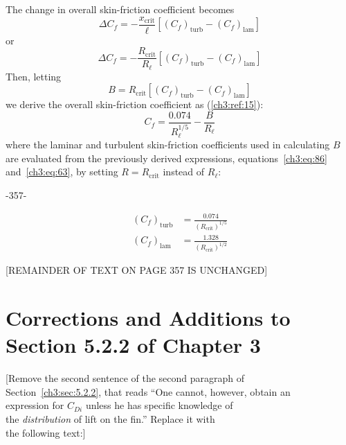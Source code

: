 The change in overall skin-friction coefficient becomes
\begin{equation*}\tag{98}
\Delta C_f = -\frac{x_{\mathrm{crit}}}{\ell}\left[(C_f)_{\mathrm{turb}} - (C_f)_{\mathrm{lam}}\right]
\end{equation*}
or
\begin{equation*}\tag{99}
\Delta C_f = -\frac{R_{\mathrm{crit}}}{R_\ell}\left[(C_f)_{\mathrm{turb}} - (C_f)_{\mathrm{lam}}\right]
\end{equation*}
Then, letting
\begin{equation*}\tag{100}
B = R_{\mathrm{crit}}\left[(C_f)_{\mathrm{turb}} - (C_f)_{\mathrm{lam}}\right]
\end{equation*}
we derive the overall skin-friction coefficient as (\ref{ch3:ref:15}):
\begin{equation*}\tag{101}
C_f = \frac{0.074}{R_\ell^{1/5}} - \frac{B}{R_\ell}
\end{equation*}
where the laminar and turbulent skin-friction coefficients used in calculating
$B$ are evaluated from the previously derived expressions, equations~\eqref{ch3:eq:86}
and~\eqref{ch3:eq:63}, by setting $R = R_{\mathrm{crit}}$ instead of $R_\ell$:

\begin{center}
-357-
\end{center}
\begin{align*}
(C_f)_{\mathrm{turb}} &= \frac{0.074}{(R_{\mathrm{crit}})^{1/5}} \tag{102a}\\
(C_f)_{\mathrm{lam}} &= \frac{1.328}{(R_{\mathrm{crit}})^{1/2}} \tag{102b}
\end{align*}

\begin{center}
[REMAINDER OF TEXT ON PAGE 357 IS UNCHANGED]
\end{center}

\chapter{Corrections and Additions to Section 5.2.2 of Chapter 3}\label{supp:ch3-522}

\begin{center}
[Remove the second sentence of the second paragraph of\\
Section~\ref{ch3:sec:5.2.2}, that reads ``One cannot, however, obtain an\\
expression for $C_{Di}$ unless he has specific knowledge of\\
the \emph{distribution} of lift on the fin.'' Replace it with\\
the following text:]
\end{center}

